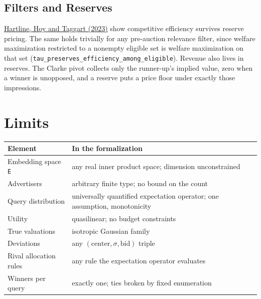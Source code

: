 \subsection{Filters and Reserves}\label{filters-and-reserves}

\href{https://arxiv.org/abs/2310.03702}{Hartline, Hoy and Taggart
(2023)} show competitive efficiency survives reserve pricing. The same
holds trivially for any pre-auction relevance filter, since welfare
maximization restricted to a nonempty eligible set is welfare
maximization on that set
(\texttt{tau\_preserves\_efficiency\_among\_eligible}). Revenue also
lives in reserves. The Clarke pivot collects only the runner-up's
implied value, zero when a winner is unopposed, and a reserve puts a
price floor under exactly those impressions.

\section{Limits}\label{limits}

{\def\LTcaptype{none} %
\begin{longtable}[]{@{}
  >{\raggedright\arraybackslash}p{}
  >{\raggedright\arraybackslash}p{}@{}}
\toprule\noalign{}
\begin{minipage}[b]{\linewidth}\raggedright
Element
\end{minipage} & \begin{minipage}[b]{\linewidth}\raggedright
In the formalization
\end{minipage} \\
\midrule\noalign{}
\endhead
\bottomrule\noalign{}
\endlastfoot
Embedding space \texttt{E} & any real inner product space; dimension
unconstrained \\
Advertisers & arbitrary finite type; no bound on the count \\
Query distribution & universally quantified expectation operator; one
assumption, monotonicity \\
Utility & quasilinear; no budget constraints \\
True valuations & isotropic Gaussian family \\
Deviations & any \((\mathrm{center}, \sigma , \mathrm{bid})\) triple \\
Rival allocation rules & any rule the expectation operator evaluates \\
Winners per query & exactly one; ties broken by fixed enumeration \\
\end{longtable}
}

